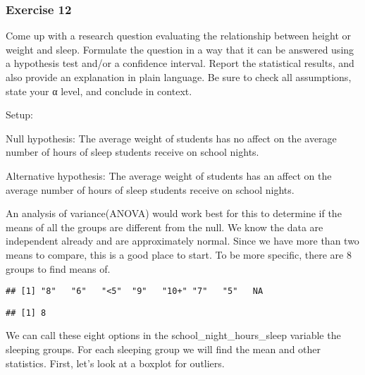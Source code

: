\documentclass[
]{article}
\newenvironment{Shaded}{\begin{snugshade}}{\end{snugshade}}
\newcommand{\KeywordTok}[1]{\textcolor[rgb]{0.13,0.29,0.53}{\textbf{#1}}}
\newcommand{\NormalTok}[1]{#1}
\newcommand{\OperatorTok}[1]{\textcolor[rgb]{0.81,0.36,0.00}{\textbf{#1}}}
\begin{document}
\hypertarget{exercise-12}{%
\subsubsection{Exercise 12}\label{exercise-12}}

Come up with a research question evaluating the relationship between
height or weight and sleep. Formulate the question in a way that it can
be answered using a hypothesis test and/or a confidence interval. Report
the statistical results, and also provide an explanation in plain
language. Be sure to check all assumptions, state your α level, and
conclude in context.

Setup:

Null hypothesis: The average weight of students has no affect on the
average number of hours of sleep students receive on school nights.

Alternative hypothesis: The average weight of students has an affect on
the average number of hours of sleep students receive on school nights.

An analysis of variance(ANOVA) would work best for this to determine if
the means of all the groups are different from the null. We know the
data are independent already and are approximately normal. Since we have
more than two means to compare, this is a good place to start. To be
more specific, there are 8 groups to find means of.

\begin{Shaded}
\end{Shaded}

\begin{verbatim}
## [1] "8"   "6"   "<5"  "9"   "10+" "7"   "5"   NA
\end{verbatim}

\begin{Shaded}
\end{Shaded}

\begin{verbatim}
## [1] 8
\end{verbatim}

We can call these eight options in the school\_night\_hours\_sleep
variable the sleeping groups. For each sleeping group we will find the
mean and other statistics. First, let's look at a boxplot for outliers.
\end{document}
